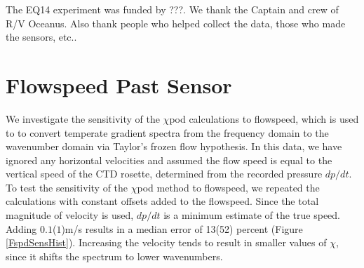 \documentclass{ametsoc}
\begin{document}
%
\acknowledgments
The EQ14 experiment was funded by ???. We thank the Captain and crew of R/V Oceanus. Also thank people who helped collect the data, those who made the sensors, etc..


%


%


\appendix[A]


\section{Flowspeed Past Sensor}

We investigate the sensitivity of the $\chi$pod calculations to flowspeed, which is used to to convert 	temperate gradient spectra from the frequency domain to the wavenumber domain via Taylor's frozen flow hypothesis. In this data, we have ignored any horizontal velocities and assumed the flow speed is equal to the vertical speed of the CTD rosette, determined from the recorded pressure $dp/dt$. To test the sensitivity of the $\chi$pod method to flowspeed, we repeated the calculations with constant offsets added to the flowspeed. Since the total magnitude of velocity is used, $dp/dt$ is a minimum estimate of the true speed. Adding $0.1$($1$)m/s results in a median error of 13(52) percent (Figure \ref{FspdSensHist}). Increasing the velocity tends to result in smaller values of $\chi$, since it shifts the spectrum to lower wavenumbers. 
\end{document}
